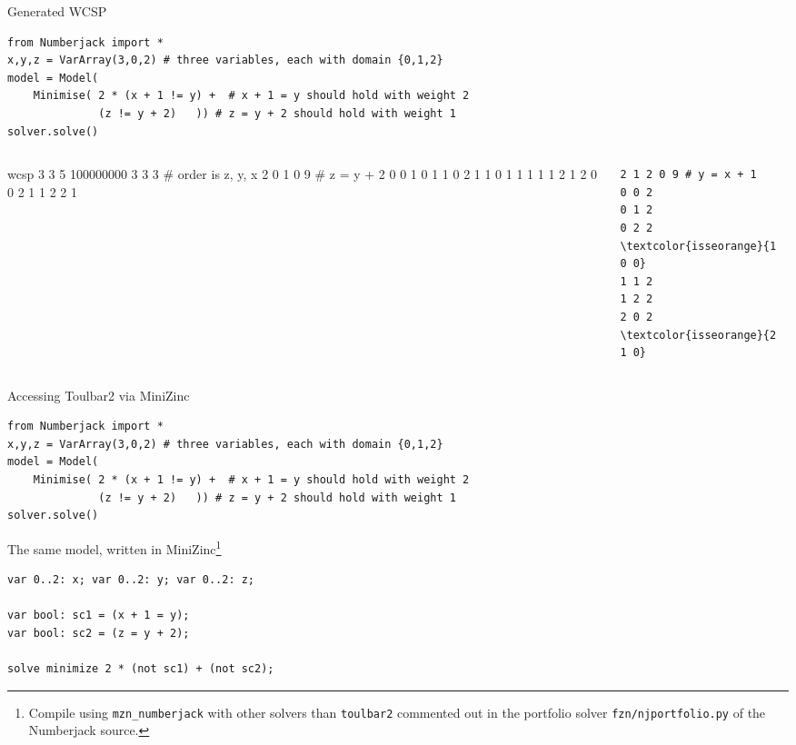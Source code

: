 \documentclass[handout,10pt,xcolor={dvipsnames},fleqn]{beamer}
\begin{document}
\begin{frame}[fragile]{Generated WCSP}
\lstset{language=python}
\begin{lstlisting}
from Numberjack import * 
x,y,z = VarArray(3,0,2) # three variables, each with domain {0,1,2}
model = Model(
    Minimise( 2 * (x + 1 != y) +  # x + 1 = y should hold with weight 2
              (z != y + 2)   )) # z = y + 2 should hold with weight 1
solver.solve()
\end{lstlisting}

\lstset{language=mzn}

\small 
\begin{columns}[T]
    \begin{column}{.4\textwidth}
\begin{semiverbatim}
wcsp 3 3 5 100000000
3 3 3 # order is z, y, x
2 0 1 0 9 # z = y + 2
0 0 1
0 1 1
0 2 1
1 0 1
1 1 1
1 2 1
\textcolor{isseorange}{2 0 0}
2 1 1
2 2 1
\end{semiverbatim}
    \end{column}
    \begin{column}{.4\textwidth}
\begin{Verbatim}[commandchars=\\\{\}]
2 1 2 0 9 # y = x + 1
0 0 2
0 1 2
0 2 2
\textcolor{isseorange}{1 0 0}
1 1 2
1 2 2
2 0 2
\textcolor{isseorange}{2 1 0}
\end{Verbatim}
\end{column}
\end{columns}
\end{frame}

\begin{frame}[fragile]{Accessing Toulbar2 via MiniZinc}

\lstset{language=python}
\begin{lstlisting}
from Numberjack import * 
x,y,z = VarArray(3,0,2) # three variables, each with domain {0,1,2}
model = Model(
    Minimise( 2 * (x + 1 != y) +  # x + 1 = y should hold with weight 2
              (z != y + 2)   )) # z = y + 2 should hold with weight 1
solver.solve()
\end{lstlisting}
The same model, written in MiniZinc\footnote{Compile using \texttt{mzn\_numberjack} with other solvers than \texttt{toulbar2} commented out in the portfolio solver \texttt{fzn/njportfolio.py} of the Numberjack source.}

\lstset{language=mzn}
\begin{lstlisting}
var 0..2: x; var 0..2: y; var 0..2: z;

var bool: sc1 = (x + 1 = y);
var bool: sc2 = (z = y + 2);

solve minimize 2 * (not sc1) + (not sc2); 
\end{lstlisting}
\end{frame}
\end{document}
